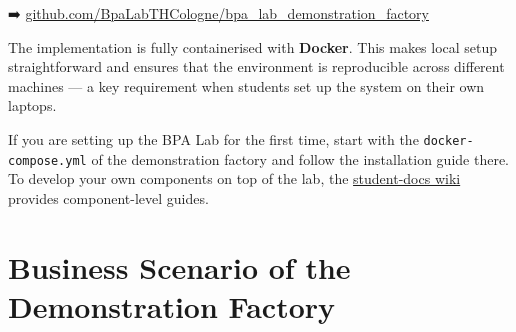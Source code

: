 \documentclass[
  english,
  11pt,
  a4paper,
]{scrbook}
\begin{document}
➡️
\href{https://github.com/BpaLabTHCologne/bpa_lab_demonstration_factory}{github.com/BpaLabTHCologne/bpa\_lab\_demonstration\_factory}

The implementation is fully containerised with \textbf{Docker}. This
makes local setup straightforward and ensures that the environment is
reproducible across different machines --- a key requirement when
students set up the system on their own laptops.

\begin{tcolorbox}[enhanced jigsaw, arc=.35mm, bottomrule=.15mm, bottomtitle=1mm, breakable, colback=white, colbacktitle=quarto-callout-tip-color!10!white, colframe=quarto-callout-tip-color-frame, coltitle=black, left=2mm, leftrule=.75mm, opacityback=0, opacitybacktitle=0.6, rightrule=.15mm, title=\textcolor{quarto-callout-tip-color}{\faLightbulb}\hspace{0.5em}{Getting started in practice}, titlerule=0mm, toprule=.15mm, toptitle=1mm]

If you are setting up the BPA Lab for the first time, start with the
\texttt{docker-compose.yml} of the demonstration factory and follow the
installation guide there. To develop your own components on top of the
lab, the
\href{https://github.com/BpaLabTHCologne/bpa_lab_student_docs/wiki}{student-docs
wiki} provides component-level guides.

\end{tcolorbox}


\chapter{Business Scenario of the Demonstration
Factory}\label{business-scenario-of-the-demonstration-factory}
\end{document}

